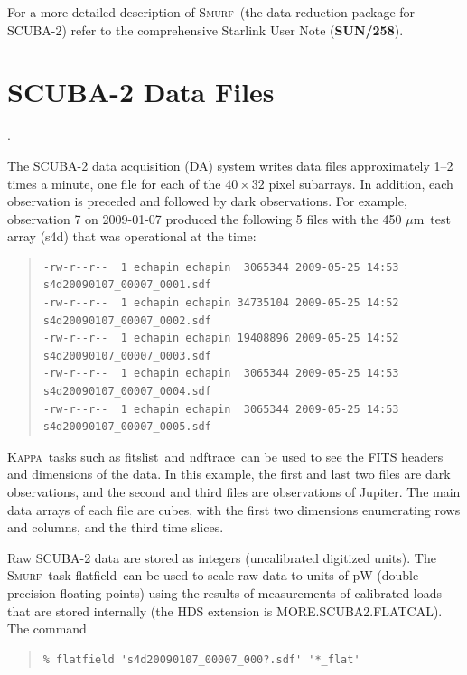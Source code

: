 \documentclass[twoside,11pt]{article}
\newcommand{\micron}{\mbox{\,${\mu}$m}}            %
\newenvironment{myquote}{\begin{quote}\begin{small}}{\end{small}\end{quote}}
\newcommand{\Kappa}{\xref{\textsc{Kappa}}{sun95}{}}
\newcommand{\smurf}{\xref{\textsc{Smurf}}{sun258}{}}
\newcommand{\task}[1]{\textsf{#1}}
\newcommand{\flatfield}{\xref{\task{flatfield}}{sun258}{FLATFIELD}}
\newcommand{\fitslist}{\xref{\task{fitslist}}{sun95}{FITSLIST}}
\newcommand{\ndftrace}{\xref{\task{ndftrace}}{sun95}{NDFTRACE}}
\newcommand{\xref}[3]{#1}
\newcommand{\xlabel}[1]{}
\renewcommand{\_}{\texttt{\symbol{95}}}
\begin{document}
For a more detailed description of \smurf\ (the data reduction package
for SCUBA-2) refer to the comprehensive Starlink User Note
(\xref{\textbf{SUN/258}}{sun258}{}).


\section{\xlabel{data_files}SCUBA-2 Data Files}
\label{sec:data}.

The SCUBA-2 data acquisition (DA) system writes data files
approximately 1--2 times a minute, one file for each of the
$40\times32$ pixel subarrays. In addition, each observation is
preceded and followed by dark observations. For example, observation 7
on 2009-01-07 produced the following 5 files with the 450\,\micron\
test array (s4d) that was operational at the time:

\begin{myquote}
\begin{verbatim}
-rw-r--r--  1 echapin echapin  3065344 2009-05-25 14:53 s4d20090107_00007_0001.sdf
-rw-r--r--  1 echapin echapin 34735104 2009-05-25 14:52 s4d20090107_00007_0002.sdf
-rw-r--r--  1 echapin echapin 19408896 2009-05-25 14:52 s4d20090107_00007_0003.sdf
-rw-r--r--  1 echapin echapin  3065344 2009-05-25 14:53 s4d20090107_00007_0004.sdf
-rw-r--r--  1 echapin echapin  3065344 2009-05-25 14:53 s4d20090107_00007_0005.sdf
\end{verbatim}
\end{myquote}

\Kappa\ tasks such as \fitslist\ and \ndftrace\ can be used to see the
FITS headers and dimensions of the data. In this example, the first
and last two files are dark observations, and the second and third
files are observations of Jupiter. The main data arrays of each file
are cubes, with the first two dimensions enumerating rows and columns,
and the third time slices.

Raw SCUBA-2 data are stored as integers (uncalibrated digitized
units). The \smurf\ task \flatfield\ can be used to scale raw data to
units of pW (double precision floating points) using the results of
measurements of calibrated loads that are stored internally (the HDS
extension is MORE.SCUBA2.FLATCAL). The command

\begin{myquote}
\begin{verbatim}
% flatfield 's4d20090107_00007_000?.sdf' '*_flat'
\end{verbatim}
\end{myquote}
\end{document}
